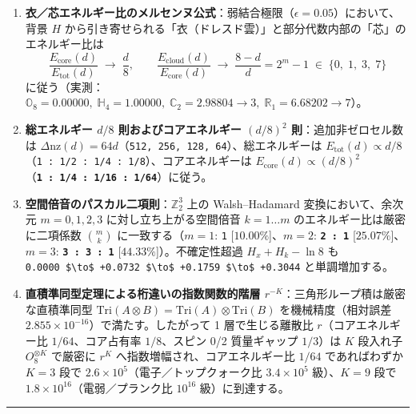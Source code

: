 \documentclass[
  a4paper,
]{ltjsarticle}
\providecommand{\tightlist}{%
  \setlength{\itemsep}{0pt}\setlength{\parskip}{0pt}}
\begin{document}
\begin{enumerate}
\def\labelenumi{\arabic{enumi}.}
\tightlist
\item
  \textbf{衣／芯エネルギー比のメルセンヌ公式}：弱結合極限（\(\epsilon = 0.05\)）において、背景
  \(H\)
  から引き寄せられる「衣（ドレスド雲）」と部分代数内部の「芯」のエネルギー比は
  \[\frac{E_{\mathrm{core}}(d)}{E_{\mathrm{tot}}(d)} \;\longrightarrow\; \frac{d}{8}, \qquad \frac{E_{\mathrm{cloud}}(d)}{E_{\mathrm{core}}(d)} \;\longrightarrow\; \frac{8 - d}{d} = 2^m - 1 \;\in\; \{0,\; 1,\; 3,\; 7\}\]
  に従う（実測：\(\mathbb{O}_8 = 0.00000,\; \mathbb{H}_4 = 1.00000,\; \mathbb{C}_2 = 2.98804 \to 3,\; \mathbb{R}_1 = 6.68202 \to 7\)）。
\item
  \textbf{総エネルギー \(d/8\) 則およびコアエネルギー \((d/8)^2\)
  則}：追加非ゼロセル数は
  \(\Delta\mathrm{nz}(d) = 64d\)（\texttt{512,\ 256,\ 128,\ 64}）、総エネルギーは
  \(E_{\mathrm{tot}}(d) \propto d/8\)（\texttt{1\ :\ 1/2\ :\ 1/4\ :\ 1/8}）、コアエネルギーは
  \(E_{\mathrm{core}}(d) \propto (d/8)^2\)（\textbf{\texttt{1\ :\ 1/4\ :\ 1/16\ :\ 1/64}}）に従う。
\item
  \textbf{空間倍音のパスカル二項則}：\(\mathbb{Z}_2^3\) 上の
  Walsh--Hadamard 変換において、余次元 \(m = 0, 1, 2, 3\)
  に対し立ち上がる空間倍音 \(k = 1 \dots m\)
  のエネルギー比は厳密に二項係数 \(\binom{m}{k}\) に一致する（\(m=1\):
  \texttt{1} {[}\(10.00\%\){]}、\(m=2\): \textbf{\texttt{2\ :\ 1}}
  {[}\(25.07\%\){]}、\(m=3\): \textbf{\texttt{3\ :\ 3\ :\ 1}}
  {[}\(44.33\%\){]}）。不確定性超過 \(H_x + H_k - \ln 8\) も
  \texttt{0.0000\ \$\textbackslash{}to\$\ +0.0732\ \$\textbackslash{}to\$\ +0.1759\ \$\textbackslash{}to\$\ +0.3044}
  と単調増加する。
\item
  \textbf{直積準同型定理による桁違いの指数関数的階層
  \(r^{-K}\)}：三角形ループ積は厳密な直積準同型
  \(\mathrm{Tri}(A \otimes B) = \mathrm{Tri}(A) \otimes \mathrm{Tri}(B)\)
  を機械精度（相対誤差
  \textbf{\(2.855 \times 10^{-16}\)}）で満たす。したがって 1
  層で生じる離散比 \(r\)（コアエネルギー比 \(1/64\)、コア占有率
  \(1/8\)、スピン 0/2 質量ギャップ \(1/3\)）は \(K\) 段入れ子
  \(O_8^{\otimes K}\) で厳密に \(r^K\) へ指数増幅され、コアエネルギー比
  \(1/64\) であればわずか \(K = 3\) 段で
  \(2.6 \times 10^5\)（電子／トップクォーク比 \(3.4 \times 10^5\)
  級）、\(K = 9\) 段で \(1.8 \times 10^{16}\)（電弱／プランク比
  \(10^{16}\) 級）に到達する。
\end{enumerate}

\begin{center}\rule{0.5\linewidth}{0.5pt}\end{center}
\end{document}
